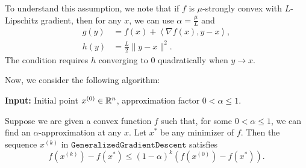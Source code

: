 To understand this assumption, we note that if $f$ is $\mu$-strongly
convex with $L$-Lipschitz gradient, then for any $x$, we can use
$\alpha=\frac{\mu}{L}$ and
\begin{align*}
g(y) & =f(x)+\left\langle \nabla f(x),y-x\right\rangle ,\\
h(y) & =\frac{L}{2}\|y-x\|^{2}.
\end{align*}
The condition requires $h$ converging to $0$ quadratically when
$y\rightarrow x$. 

Now, we consider the following algorithm:

\begin{algorithm2e}[H]

\caption{$\mathtt{GeneralizedGradientDescent}$}

\SetAlgoLined

\textbf{Input:} Initial point $x^{(0)}\in\mathbb{R}^{n}$, approximation factor
$0<\alpha\leq1$.


\end{algorithm2e}
\begin{thm}
\label{thm:gd_general_apx} Suppose we are given a convex function
$f$ such that, for some $0<\alpha\leq1$, we can find an $\alpha$-approximation
at any $x$. Let $x^{*}$ be any minimizer of $f$. Then the sequence
$x^{(k)}$ in $\mathtt{GeneralizedGradientDescent}$ satisfies
\[
f(x^{(k)})-f(x^{*})\leq(1-\alpha)^{k}(f(x^{(0)})-f(x^{*})).
\]
\end{thm}

